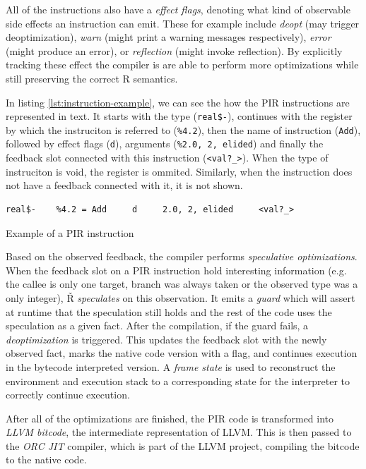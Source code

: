 All of the instructions also have a \textit{effect flags}, denoting what kind of observable side effects an instruction can emit. These for example include \textit{deopt} (may trigger deoptimization), \textit{warn} (might print a warning messages respectively), \textit{error} (might produce an error), or \textit{reflection} (might invoke reflection). By explicitly tracking these effect the compiler is are able to perform more optimizations while still preserving the correct R semantics.

In listing \ref{lst:instruction-example}, we can see the how the PIR instructions are represented in text. It starts with the type (\texttt{real\$-}), continues with the register by which the instruciton is referred to (\texttt{\%4.2}), then the name of instruction (\texttt{Add}), followed by effect flags (\texttt{d}), arguments (\texttt{\%2.0, 2, elided}) and finally the feedback slot connected with this instruction (\texttt{<val?\_>}). When the type of instruciton is void, the register is ommited. Similarly, when the instruction does not have a feedback connected with it, it is not shown.

\begin{listing}[H]
  \begin{verbatim}
real$-    %4.2 = Add     d     2.0, 2, elided     <val?_>
  \end{verbatim}
	\caption{Example of a PIR instruction}\label{lst:instruction-example}
\end{listing}

Based on the observed feedback, the compiler performs \textit{speculative optimizations}. When the feedback slot on a PIR instruction hold interesting information (e.g. the callee is only one target, branch was always taken or the observed type was a only integer), Ř \textit{speculates} on this observation. It emits a \textit{guard} which will assert at runtime that the speculation still holds and the rest of the code uses the speculation as a given fact. After the compilation, if the guard fails, a \textit{deoptimization} is triggered. This updates the feedback slot with the newly observed fact, marks the native code version with a flag, and continues execution in the bytecode interpreted version. A \textit{frame state} is used to reconstruct the environment and execution stack to a corresponding state for the interpreter to correctly continue execution.

After all of the optimizations are finished, the PIR code is transformed into \textit{LLVM bitcode}, the intermediate representation of LLVM. This is then passed to the \textit{ORC JIT} compiler, which is part of the LLVM project, compiling the bitcode to the native code.

